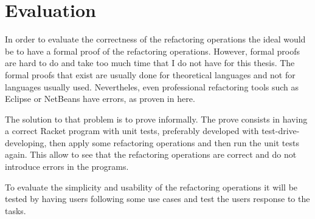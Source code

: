 
% 
% 

\section{Evaluation}


In order to evaluate the correctness of the refactoring operations the ideal would be to have a formal proof of the refactoring operations.
However, formal proofs are hard to do and take too much time that I do not have for this thesis.
The formal proofs that exist are usually done for theoretical languages and not for languages usually used.
Nevertheles, even professional refactoring tools such as Eclipse or NetBeans have errors, as proven in here. 

The solution to that problem is to prove informally. The prove consists in having a correct Racket program with unit tests, preferably developed with test-drive-developing, then apply some refactoring operations and then run the unit tests again. This allow to see that the refactoring operations are correct and do not introduce errors in the programs.

To evaluate the simplicity and usability of the refactoring operations it will be tested by having users following some use cases and test the users response to the tasks.